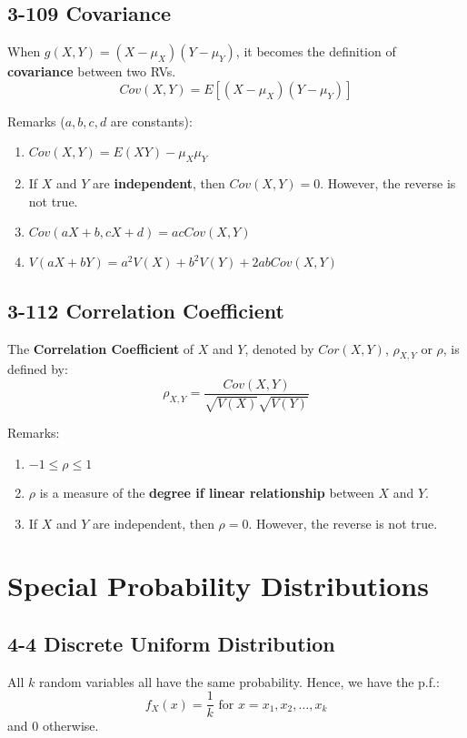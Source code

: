 \documentclass[12pt,landscape]{article}
\begin{document}
\begin{multicols}{3}
    \subsection{3-109 Covariance}
    When $g(X,Y) = (X - \mu_X)(Y - \mu_Y)$, it becomes the definition of \textbf{covariance} between two RVs.
        $$ Cov(X,Y) = E[(X - \mu_X)(Y - \mu_Y)] $$
    
    Remarks ($a,b,c,d$ are constants):
    \begin{enumerate}
        \item $Cov(X,Y) = E(XY) - \mu_X\mu_Y$
        \item If $X$ and $Y$ are \textbf{independent}, then $Cov(X,Y) = 0$. However, the reverse is not true.
        \item $Cov(aX+b, cX+d) = acCov(X,Y)$
        \item $V(aX+bY) = a^2V(X) + b^2V(Y) + 2abCov(X,Y)$
    \end{enumerate}

    \subsection{3-112 Correlation Coefficient}
    The \textbf{Correlation Coefficient} of $X$ and $Y$, denoted by $Cor(X,Y)$, $\rho_{X,Y}$ or $\rho$, is defined by:
        $$ \rho_{X,Y} = \frac{Cov(X,Y)}{\sqrt{V(X)}\sqrt{V(Y)}} $$
    
    Remarks:
    \begin{enumerate}
        \item $-1 \leq \rho \leq 1$
        \item $\rho$ is a measure of the \textbf{degree if linear relationship} between $X$ and $Y$.
        \item If $X$ and $Y$ are independent, then $\rho = 0$. However, the reverse is not true. 
    \end{enumerate}
    

    \section{Special Probability Distributions}

    \subsection{4-4 Discrete Uniform Distribution}
    All $k$ random variables all have the same probability. Hence, we have the p.f.:
        $$ f_X(x) = \frac{1}{k} \text{ for } x = x_1, x_2, \dots, x_k $$
    and 0 otherwise.


\end{multicols}
\end{document}
